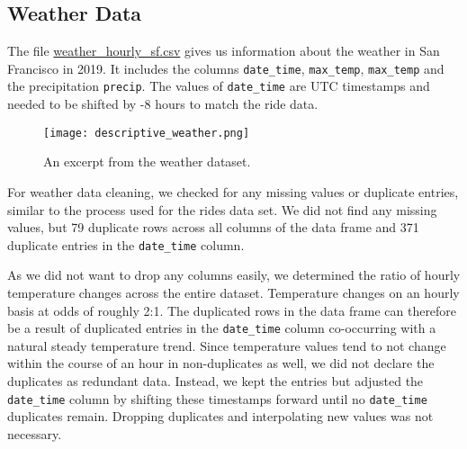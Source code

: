 \subsection{Weather Data}
The file \href{run:../../data/weather_hourly_sf.csv}{weather\_hourly\_sf.csv} gives us information about the weather in San Francisco in 2019. It includes the columns \texttt{date\_time}, \texttt{max\_temp}, \texttt{max\_temp} and the precipitation \texttt{precip}. The values of \texttt{date\_time} are UTC timestamps and needed to be shifted by -8 hours to match the ride data.

\begin{figure}[h]
    \texttt{[image: descriptive\_weather.png]}
    \caption{An excerpt from the weather dataset.}
\end{figure}

For weather data cleaning, we checked for any missing values or duplicate entries, similar to the process used for the rides data set. We did not find any missing values, but 79 duplicate rows across all columns of the data frame and 371 duplicate entries in the \texttt{date\_time} column.

As we did not want to drop any columns easily, we determined the ratio of hourly temperature changes across the entire dataset. Temperature changes on an hourly basis at odds of roughly 2:1. The duplicated rows in the data frame can therefore be a result of duplicated entries in the \texttt{date\_time} column co-occurring with a natural steady temperature trend.
Since temperature values tend to not change within the course of an hour in non-duplicates as well, we did not declare the duplicates as redundant data. Instead, we kept the entries but adjusted the \texttt{date\_time} column by shifting these timestamps forward until no \texttt{date\_time} duplicates remain. Dropping duplicates and interpolating new values was not necessary.